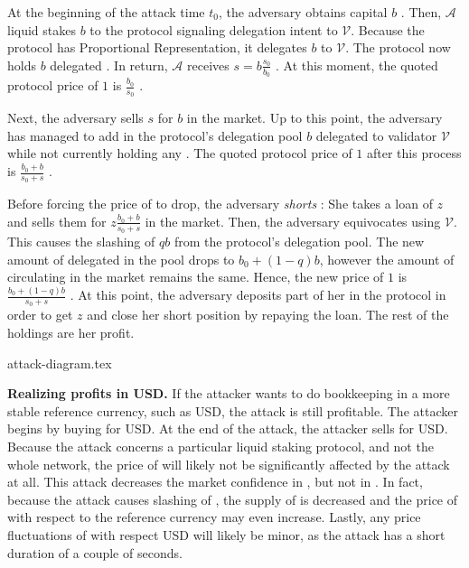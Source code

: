 At the beginning of the attack time $t_0$, the adversary obtains capital
$b$ \asset. Then, $\mathcal{A}$
liquid stakes $b$ \asset to the protocol
signaling delegation intent to $\mathcal{V}$. Because the
protocol has Proportional Representation, it delegates $b$ \asset to $\mathcal{V}$.
The protocol now holds $b$ delegated \asset.
In return, $\mathcal{A}$ receives $s = b \frac{s_0}{b_0}$ \stasset.
At this moment, the quoted protocol price of $1$ \stasset is
$\frac{b_0}{s_0}$ \asset.

Next, the adversary sells $s$ \stasset for $b$ \asset in the market.
Up to this point, the adversary
has managed to add in the protocol's delegation pool $b$
\asset delegated to validator $\mathcal{V}$ while not currently holding
any \stasset. The quoted protocol price of $1$ \stasset after this process
is $\frac{b_0 + b}{s_0 + s}$ \asset.

Before forcing the price of \stasset to drop, the adversary \emph{shorts}
\stasset: She takes a loan of $z$ \stasset and sells them for
$z \frac{b_0 + b}{s_0 + s}$ \asset in the market.
Then, the adversary equivocates using $\mathcal{V}$. This causes the
slashing of $qb$ \asset from the protocol's delegation pool. The new
amount of delegated \asset in the pool drops to $b_0 + (1 - q) b$, however
the amount of \stasset circulating in the market remains the same. Hence,
the new price of $1$ \stasset is $\frac{b_0 + (1 - q) b}{s_0 + s}$ \asset.
At this point, the adversary deposits part of her \asset in the protocol
in order to get $z$ \stasset and close her short position by repaying the loan.
The rest of the \asset holdings are her profit.


{attack-diagram.tex}

\noindent
\textbf{Realizing profits in USD.}
If the attacker wants to do bookkeeping in a more stable reference currency,
such as USD, the attack is still profitable. The attacker begins by buying
\asset for USD. At the end of the attack, the attacker sells \asset for USD.
Because the attack concerns a particular liquid staking protocol, and
not the whole \asset network, the price of \asset will likely not
be significantly affected by the attack at all.
This attack decreases the market confidence in \stasset,
but not in \asset.
In fact, because
the attack causes slashing of \asset, the supply of \asset is decreased
and the price of \asset with respect to the reference currency may
even increase.
Lastly, any price fluctuations of \asset with respect USD will likely be
minor, as the attack has a short duration of a couple of seconds.
